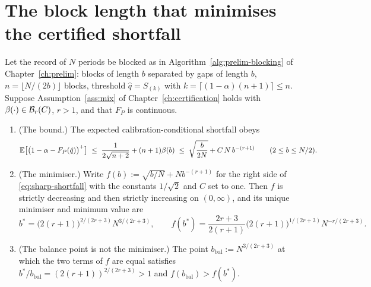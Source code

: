 \documentclass[../../../main.tex]{subfiles}
\begin{document}
\section{The block length that minimises the certified shortfall}\label{sec:sharp-block}

\begin{theorem}\label{thm:block-b}
Let the record of $N$ periods be blocked as in Algorithm~\ref{alg:prelim-blocking} of Chapter~\ref{ch:prelim}: blocks of length $b$ separated by gaps of length $b$, $n=\lfloor N/(2b)\rfloor$ blocks, threshold $\hat q=S_{(k)}$ with $k=\lceil(1-\alpha)(n+1)\rceil\le n$. Suppose Assumption~\ref{ass:mix} of Chapter~\ref{ch:certification} holds with $\beta(\cdot)\in\mathcal B_{r}(C)$, $r>1$, and that $F_P$ is continuous.
\begin{enumerate}[nosep,label=(\alph*)]
\item (The bound.) The expected calibration-conditional shortfall obeys
\begin{equation}\label{eq:sharp-shortfall}
\mathbb{E}\big[\big(1-\alpha-F_P(\hat q)\big)^+\big]\;\le\;\frac1{2\sqrt{n+2}}+(n+1)\beta(b)\;\le\;\sqrt{\frac b{2N}}+C\,N\,b^{-(r+1)}\qquad(2\le b\le N/2).
\end{equation}
\item (The minimiser.) Write $f(b):=\sqrt{b/N}+Nb^{-(r+1)}$ for the right side of \eqref{eq:sharp-shortfall} with the constants $1/\sqrt2$ and $C$ set to one. Then $f$ is strictly decreasing and then strictly increasing on $(0,\infty)$, and its unique minimiser and minimum value are
\begin{equation}\label{eq:sharp-bstar}
b^*=\big(2(r+1)\big)^{2/(2r+3)}N^{3/(2r+3)},\qquad
f(b^*)=\frac{2r+3}{2(r+1)}\big(2(r+1)\big)^{1/(2r+3)}N^{-r/(2r+3)} .
\end{equation}
\item (The balance point is not the minimiser.) The point $b_{\mathrm{bal}}:=N^{3/(2r+3)}$ at which the two terms of $f$ are equal satisfies $b^*/b_{\mathrm{bal}}=(2(r+1))^{2/(2r+3)}>1$ and $f(b_{\mathrm{bal}})>f(b^*)$.
\end{enumerate}
\end{theorem}
\end{document}
